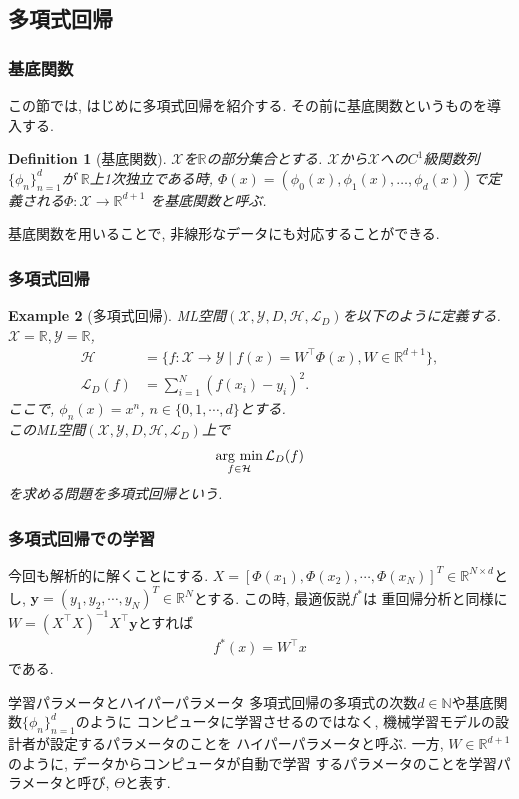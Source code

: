 \documentclass[dvipdfmx,11pt]{beamer}		%
\newtheorem{defi}{Definition}
\newtheorem{exam}[defi]{Example}
\newcommand{\N}{\mathbb{N}}
\newcommand{\R}{\mathbb{R}}
\newcommand{\X}{\mathcal{X}}
\newcommand{\Y}{\mathcal{Y}}
\newcommand{\Hil}{\mathcal{H}}
\newcommand{\Loss}{\mathcal{L}_{D}}
\newcommand{\MLsp}{(\X, \Y, D, \Hil, \Loss)}
\newcommand{\argmin}{\mathop{\rm arg~min}\limits}
\begin{document}
    \subsection{多項式回帰}
    \begin{frame}
        \frametitle{基底関数}
        この節では, はじめに多項式回帰を紹介する. 
        その前に基底関数というものを導入する. 
        \begin{defi}[基底関数]
            $\X$を$\R$の部分集合とする. $\X$から$\X$への$C^1$級関数列$\{\phi_{n}\}_{n = 1}^{d}$が
            $\R$上1次独立である時, $\Phi(x) = (\phi_{0}(x), \phi_{1}(x), \ldots, \phi_{d}(x))$で定義される$\Phi:\X\to\R^{d + 1}$
            を基底関数と呼ぶ. 
        \end{defi}
        基底関数を用いることで, 非線形なデータにも対応することができる. 
    \end{frame}
    \begin{frame}\frametitle{多項式回帰}
        \begin{exam}[多項式回帰]
            ML空間$\MLsp$を以下のように定義する.\\
            $\X = \R, \Y = \R$, 
            \begin{align*}
                \Hil &= \{f:\X\to\Y\mid f(x) = W^{\top}\Phi(x), W\in\R^{d + 1}\},\\
                \Loss(f) &= \sum_{i = 1}^{N}(f(x_i) - y_i)^2.
            \end{align*}
            ここで, $\phi_{n}(x) = x^{n}$, $n\in\{0, 1, \cdots, d\}$とする.\\
            このML空間$\MLsp$上で
            \begin{align*}
                \argmin_{f\in\Hil}\Loss(f)
            \end{align*}
            を求める問題を多項式回帰という. 
        \end{exam}
    \end{frame}
    \begin{frame}
        \frametitle{多項式回帰での学習}
            今回も解析的に解くことにする. $X = [\Phi(x_1), \Phi(x_{2}), \cdots, \Phi(x_N)]^{T}\in\R^{N\times d}$とし, 
            $\mathbf{y} = (y_{1}, y_{2}, \cdots, y_{N})^{T}\in\R^{N}$とする. この時, 最適仮説$f^{*}$は
            重回帰分析と同様に$W = (X^\top X)^{-1}X^\top\mathbf{y}$とすれば
            \begin{align*}
                f^{*}(x) = W^{\top}x
            \end{align*}
            である. 
            \begin{block}{学習パラメータとハイパーパラメータ}
                多項式回帰の多項式の次数$d\in\N$や基底関数$\{\phi_{n}\}_{n = 1}^{d}$のように
                コンピュータに学習させるのではなく, 機械学習モデルの設計者が設定するパラメータのことを
                ハイパーパラメータと呼ぶ. 一方, $W\in\R^{d + 1}$のように, データからコンピュータが自動で学習
                するパラメータのことを学習パラメータと呼び, $\Theta$と表す.
            \end{block}
    \end{frame}
\end{document}
